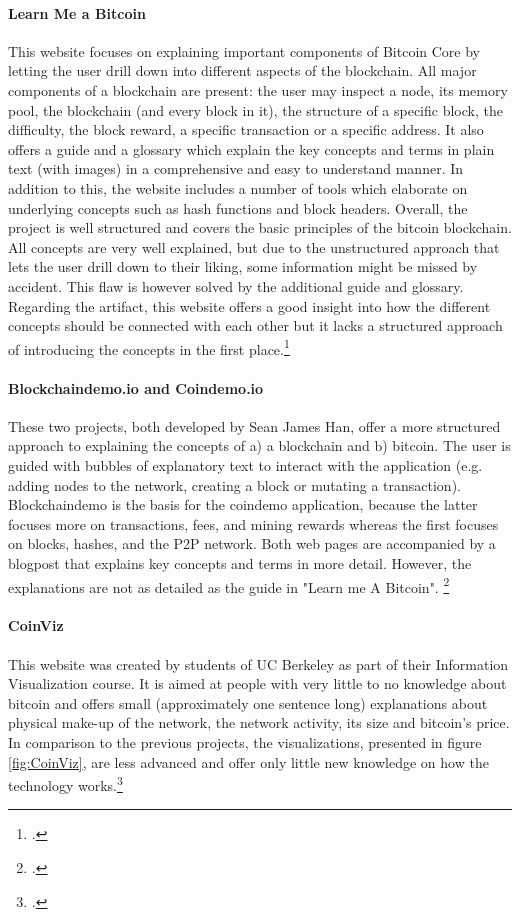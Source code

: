\paragraph{Learn Me a Bitcoin} This website focuses on explaining important components of Bitcoin Core by letting the user drill down into different aspects of the blockchain. All major components of a blockchain are present: the user may inspect a node, its memory pool, the blockchain (and every block in it), the structure of a specific block, the difficulty, the block reward, a specific transaction or a specific address. It also offers a guide and a glossary which explain the key concepts and terms in plain text (with images) in a comprehensive and easy to understand manner. In addition to this, the website includes a number of tools which elaborate on underlying concepts such as hash functions and block headers. Overall, the project is well structured and covers the basic principles of the bitcoin blockchain. All concepts are very well explained, but due to the unstructured approach that lets the user drill down to their liking, some information might be missed by accident. This flaw is however solved by the additional guide and glossary. Regarding the artifact, this website offers a good insight into how the different concepts should be connected with each other but it lacks a structured approach of introducing the concepts in the first place.\footcite[Cf.][]{WalkerLearnmeBitcoin2016}

\paragraph{Blockchaindemo.io and Coindemo.io} These two projects, both developed by Sean James Han, offer a more structured approach to explaining the concepts of a) a blockchain and b) bitcoin. The user is guided with bubbles of explanatory text to interact with the application (e.g. adding nodes to the network, creating a block or mutating a transaction). Blockchaindemo is the basis for the coindemo application, because the latter focuses more on transactions, fees, and mining rewards whereas the first focuses on blocks, hashes, and the P2P network. Both web pages are accompanied by a blogpost that explains key concepts and terms in more detail. However, the explanations are not as detailed as the guide in "Learn me A Bitcoin".  \footcites[Cf.][]{HanHowdoesblockchain2017}[cf.][]{HanBlockchainDemo2017}[cf.][]{HanHowdoesbitcoin2017}[cf.][]{HanCoinDemo2017}

\paragraph{CoinViz} This website was created by students of UC Berkeley as part of their Information Visualization course. It is aimed at people with very little to no knowledge about bitcoin and offers small (approximately one sentence long) explanations about physical make-up of the network, the network activity, its size and bitcoin's price. In comparison to the previous projects, the visualizations, presented in figure \ref{fig:CoinViz}, are less advanced and offer only little new knowledge on how the technology works.\footcite[Cf.][]{GiudiciCoinViz2016}

